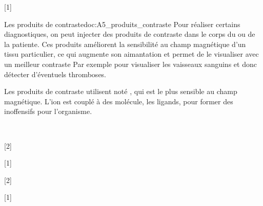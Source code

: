 [1]


\begin{doc}{Les produits de contraste}{doc:A5_produits_contraste}
  Pour réaliser certains diagnostiques, on peut injecter des produits de contraste dans le corps du ou de la patiente.
  Ces produits améliorent la sensibilité au champ magnétique d'un tissu particulier, ce qui augmente son aimantation et permet de le visualiser avec un meilleur contraste
  Par exemple pour visualiser les vaisseaux sanguins et donc détecter d'éventuels thromboses.

  Les produits de contraste utilisent  noté , qui est le plus sensible au champ magnétique.
  L'ion est couplé à des molécule, les ligands, pour former des  inoffensifs pour l'organisme.

  \begin{center}
     \\[6pt]
  \end{center}
\end{doc}


[2]

[1]

[2]

[1]
